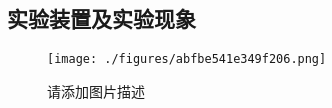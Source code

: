 

\subsection{实验装置及实验现象}
\begin{figure}[ht]
\centering
\texttt{[image: ./figures/abfbe541e349f206.png]}
\caption{请添加图片描述} \label{fig_DCQEE_1}
\end{figure}








